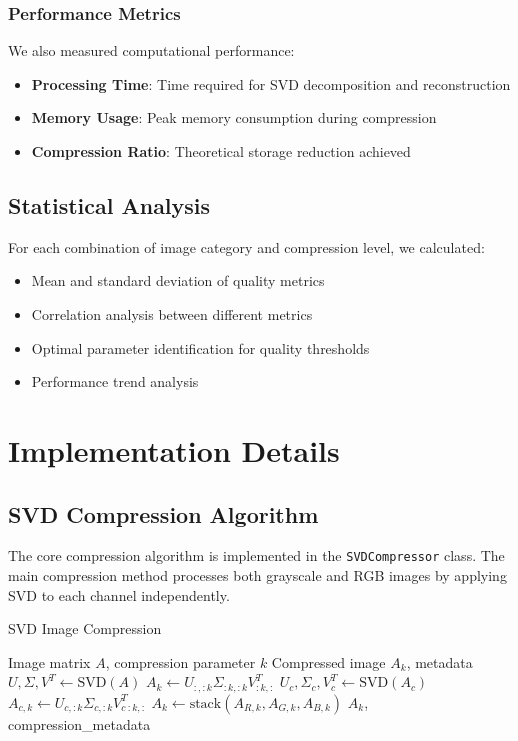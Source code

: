 \documentclass[12pt,a4paper]{article}
\begin{document}
\subsubsection{Performance Metrics}

We also measured computational performance:
\begin{itemize}
    \item \textbf{Processing Time}: Time required for SVD decomposition and reconstruction
    \item \textbf{Memory Usage}: Peak memory consumption during compression
    \item \textbf{Compression Ratio}: Theoretical storage reduction achieved
\end{itemize}

\subsection{Statistical Analysis}

For each combination of image category and compression level, we calculated:
\begin{itemize}
    \item Mean and standard deviation of quality metrics
    \item Correlation analysis between different metrics
    \item Optimal parameter identification for quality thresholds
    \item Performance trend analysis
\end{itemize}

\section{Implementation Details}

\subsection{SVD Compression Algorithm}

The core compression algorithm is implemented in the \texttt{SVDCompressor} class. The main compression method processes both grayscale and RGB images by applying SVD to each channel independently.

\begin{algorithm}
\caption{SVD Image Compression}
\begin{algorithmic}[1]
\REQUIRE Image matrix $A$, compression parameter $k$
\ENSURE Compressed image $A_k$, metadata
    \STATE $U, \Sigma, V^T \leftarrow \text{SVD}(A)$
    \STATE $A_k \leftarrow U_{:,:k} \Sigma_{:k,:k} V^T_{:k,:}$
\ELSE
        \STATE $U_c, \Sigma_c, V_c^T \leftarrow \text{SVD}(A_c)$
        \STATE $A_{c,k} \leftarrow U_{c,:k} \Sigma_{c,:k} V_c^T_{:k,:}$
    \ENDFOR
    \STATE $A_k \leftarrow \text{stack}(A_{R,k}, A_{G,k}, A_{B,k})$
\ENDIF
\RETURN $A_k$, compression\_metadata
\end{algorithmic}
\end{algorithm}
\end{document}
